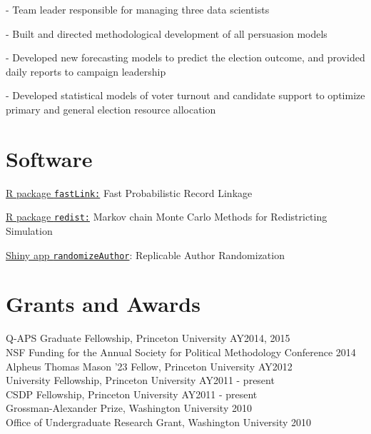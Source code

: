 \documentclass[]{deedy-resume-openfont}
\begin{document}
\begin{tightemize}
\item[-] Team leader responsible for managing three data scientists
\item[-] Built and directed methodological development of all persuasion models
\item[-] Developed new forecasting models to predict the election outcome, and provided daily reports to campaign leadership
\item[-] Developed statistical models of voter turnout and candidate support to optimize primary and general election resource allocation
\end{tightemize}
\sectionsep

\sectionsep

\section{Software}
\href{https://github.com/kosukeimai/fastLink}{R package \texttt{fastLink:}} Fast Probabilistic Record Linkage \\\vspace{2mm}

\href{https://github.com/kosukeimai/redist}{R package \texttt{redist:}} Markov chain Monte Carlo Methods for Redistricting Simulation\\\vspace{2mm}

\href{https://randomizeauthor.shinyapps.io/shiny/}{Shiny app \texttt{randomizeAuthor}}: Replicable Author Randomization
\sectionsep

\section{Grants and Awards}
Q-APS Graduate Fellowship, Princeton University \hfill AY2014, 2015\\
NSF Funding for the Annual Society for Political Methodology Conference \hfill 2014\\
Alpheus Thomas Mason '23 Fellow, Princeton University \hfill AY2012\\
University Fellowship, Princeton University \hfill AY2011 - present\\
CSDP Fellowship, Princeton University \hfill AY2011 - present\\
Grossman-Alexander Prize, Washington University \hfill 2010\\
Office of Undergraduate Research Grant, Washington University \hfill 2010\\
\sectionsep
\end{document}
